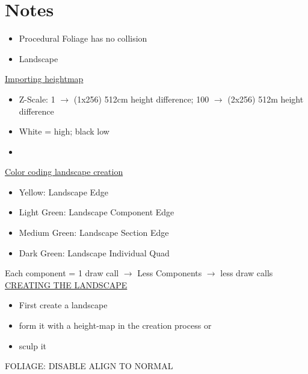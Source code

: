     \section{Notes}
        \begin{itemize}
            \item Procedural Foliage has no collision
        \end{itemize}
        \begin{itemize}
            \item Landscape
        \end{itemize}
        \underline{Importing heightmap}
        \begin{itemize}
            \item Z-Scale: 1 $\rightarrow$ (1x256) 512cm height difference; 100 $\rightarrow$ (2x256) 512m height difference
            \item White = high; black low
        \end{itemize}
        \begin{itemize}
            \item 
        \end{itemize}
        \underline{Color coding landscape creation}
        \begin{itemize}
            \item Yellow: Landscape Edge
            \item Light Green: Landscape Component Edge
            \item Medium Green: Landscape Section Edge
            \item Dark Green: Landscape Individual Quad
        \end{itemize}
        Each component = 1 draw call $\rightarrow$ Less Components $\rightarrow$ less draw calls \\
\bigskip
        \underline{CREATING THE LANDSCAPE}
        \begin{itemize}
            \item First create a landscape
            \item form it with a height-map in the creation process or
            \item sculp it
        \end{itemize}



        FOLIAGE: DISABLE ALIGN TO NORMAL \\
